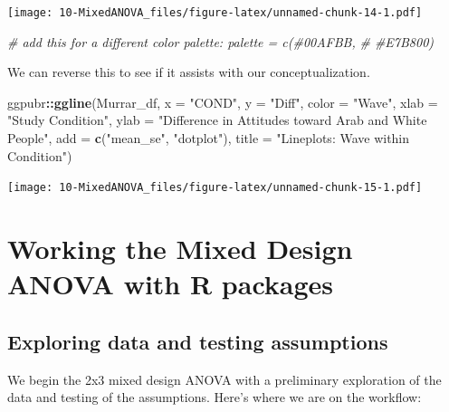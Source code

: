 \documentclass[
  11pt,
]{book}
\newenvironment{Shaded}{\begin{snugshade}}{\end{snugshade}}
\newcommand{\AttributeTok}[1]{\textcolor[rgb]{0.27,0.27,0.27}{#1}}
\newcommand{\CommentTok}[1]{\textcolor[rgb]{0.37,0.37,0.37}{\textit{#1}}}
\newcommand{\FunctionTok}[1]{\textcolor[rgb]{0.27,0.27,0.27}{\textbf{#1}}}
\newcommand{\NormalTok}[1]{#1}
\newcommand{\SpecialCharTok}[1]{\textcolor[rgb]{0.43,0.43,0.43}{\textbf{#1}}}
\newcommand{\StringTok}[1]{\textcolor[rgb]{0.5,0.5,0.5}{#1}}
\begin{document}
\texttt{[image: 10-MixedANOVA\_files/figure-latex/unnamed-chunk-14-1.pdf]}

\begin{Shaded}
\begin{Highlighting}[]
\CommentTok{\# add this for a different color palette: palette = c(\textquotesingle{}\#00AFBB\textquotesingle{},}
\CommentTok{\# \textquotesingle{}\#E7B800\textquotesingle{})}
\end{Highlighting}
\end{Shaded}

We can reverse this to see if it assists with our conceptualization.

\begin{Shaded}
\begin{Highlighting}[]
\NormalTok{ggpubr}\SpecialCharTok{::}\FunctionTok{ggline}\NormalTok{(Murrar\_df, }\AttributeTok{x =} \StringTok{"COND"}\NormalTok{, }\AttributeTok{y =} \StringTok{"Diff"}\NormalTok{, }\AttributeTok{color =} \StringTok{"Wave"}\NormalTok{, }\AttributeTok{xlab =} \StringTok{"Study Condition"}\NormalTok{,}
    \AttributeTok{ylab =} \StringTok{"Difference in Attitudes toward Arab and White People"}\NormalTok{, }\AttributeTok{add =} \FunctionTok{c}\NormalTok{(}\StringTok{"mean\_se"}\NormalTok{,}
        \StringTok{"dotplot"}\NormalTok{), }\AttributeTok{title =} \StringTok{"Lineplots: Wave within Condition"}\NormalTok{)}
\end{Highlighting}
\end{Shaded}

\texttt{[image: 10-MixedANOVA\_files/figure-latex/unnamed-chunk-15-1.pdf]}

\hypertarget{working-the-mixed-design-anova-with-r-packages}{%
\section{Working the Mixed Design ANOVA with R packages}\label{working-the-mixed-design-anova-with-r-packages}}

\hypertarget{exploring-data-and-testing-assumptions}{%
\subsection{Exploring data and testing assumptions}\label{exploring-data-and-testing-assumptions}}

We begin the 2x3 mixed design ANOVA with a preliminary exploration of the data and testing of the assumptions. Here's where we are on the workflow:
\end{document}
